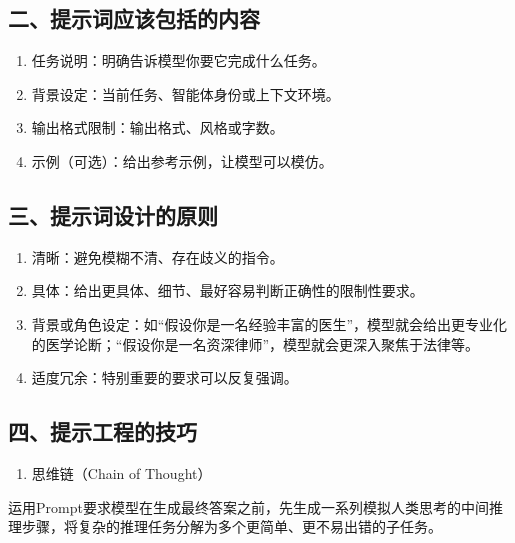 \hypertarget{ux4e8cux63d0ux793aux8bcdux5e94ux8be5ux5305ux62ecux7684ux5185ux5bb9}{%
\subsection{二、提示词应该包括的内容}\label{ux4e8cux63d0ux793aux8bcdux5e94ux8be5ux5305ux62ecux7684ux5185ux5bb9}}

\begin{enumerate}
\def\labelenumi{\arabic{enumi}.}
\item
  任务说明：明确告诉模型你要它完成什么任务。
\item
  背景设定：当前任务、智能体身份或上下文环境。
\item
  输出格式限制：输出格式、风格或字数。
\item
  示例（可选）：给出参考示例，让模型可以模仿。
\end{enumerate}

\hypertarget{ux4e09ux63d0ux793aux8bcdux8bbeux8ba1ux7684ux539fux5219}{%
\subsection{三、提示词设计的原则}\label{ux4e09ux63d0ux793aux8bcdux8bbeux8ba1ux7684ux539fux5219}}

\begin{enumerate}
\def\labelenumi{\arabic{enumi}.}
\item
  清晰：避免模糊不清、存在歧义的指令。
\item
  具体：给出更具体、细节、最好容易判断正确性的限制性要求。
\item
  背景或角色设定：如``假设你是一名经验丰富的医生''，模型就会给出更专业化的医学论断；``假设你是一名资深律师''，模型就会更深入聚焦于法律等。
\item
  适度冗余：特别重要的要求可以反复强调。
\end{enumerate}

\hypertarget{ux56dbux63d0ux793aux5de5ux7a0bux7684ux6280ux5de7}{%
\subsection{四、提示工程的技巧}\label{ux56dbux63d0ux793aux5de5ux7a0bux7684ux6280ux5de7}}

\begin{enumerate}
\def\labelenumi{\arabic{enumi}.}
\tightlist
\item
  思维链（Chain of Thought）
\end{enumerate}

运用Prompt要求模型在生成最终答案之前，先生成一系列模拟人类思考的中间推理步骤，将复杂的推理任务分解为多个更简单、更不易出错的子任务。

